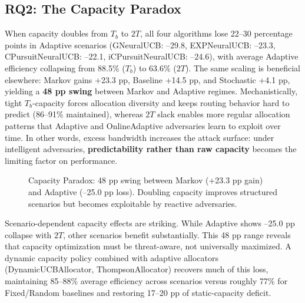 \documentclass[10pt,twocolumn,journal]{IEEEtran}
\begin{document}
\subsection{RQ2: The Capacity Paradox}

When capacity doubles from $T_b$ to $2T$, all four algorithms lose 22--30 percentage points in Adaptive scenarios (GNeuralUCB: --29.8, EXPNeuralUCB: --23.3, CPursuitNeuralUCB: --22.1, iCPursuitNeuralUCB: --24.6), with average Adaptive efficiency collapsing from 88.5\% ($T_b$) to 63.6\% ($2T$). The same scaling is beneficial elsewhere: Markov gains +23.3 pp, Baseline +14.5 pp, and Stochastic +4.1 pp, yielding a \textbf{48 pp swing} between Markov and Adaptive regimes. Mechanistically, tight $T_b$-capacity forces allocation diversity and keeps routing behavior hard to predict (86--91\% maintained), whereas $2T$ slack enables more regular allocation patterns that Adaptive and OnlineAdaptive adversaries learn to exploit over time. In other words, excess bandwidth increases the attack surface: under intelligent adversaries, \textbf{predictability rather than raw capacity} becomes the limiting factor on performance.

\begin{figure}[t]
\centering
{}
\caption{Capacity Paradox: 48 pp swing between Markov (+23.3 pp gain) and Adaptive (--25.0 pp loss). Doubling capacity improves structured scenarios but becomes exploitable by reactive adversaries.}
\label{fig:capacity_paradox}
\end{figure}

Scenario-dependent capacity effects are striking. While Adaptive shows --25.0 pp collapse with $2T$, other scenarios benefit substantially. This 48 pp range reveals that capacity optimization must be threat-aware, not universally maximized. A dynamic capacity policy combined with adaptive allocators (DynamicUCBAllocator, ThompsonAllocator) recovers much of this loss, maintaining 85--88\% average efficiency across scenarios versus roughly 77\% for Fixed/Random baselines and restoring 17--20 pp of static-capacity deficit.
\end{document}
